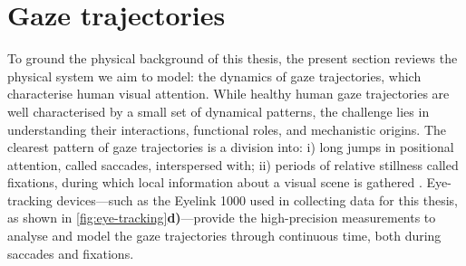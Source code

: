 \section{Gaze trajectories}
\label{sec:gaze_traj}
To ground the physical background of this thesis, the present section reviews the physical system we aim to model: the dynamics of gaze trajectories, which characterise human visual attention. While healthy human gaze trajectories are well characterised by a small set of dynamical patterns, the challenge lies in understanding their interactions, functional roles, and mechanistic origins. The clearest pattern of gaze trajectories is a division into: i) long jumps in positional attention, called saccades, interspersed with; ii) periods of relative stillness called fixations, during which local information about a visual scene is gathered \cite{erkelens_coordination_2006, seung_how_1996, lencastre_dynamical_2025, benitezy_eyetracking_1970}. Eye-tracking devices---such as the Eyelink 1000 used in collecting data for this thesis, as shown in \cref{fig:eye-tracking}\textbf{d)}---provide the high-precision measurements to analyse and model the gaze trajectories through continuous time, both during saccades and fixations.



